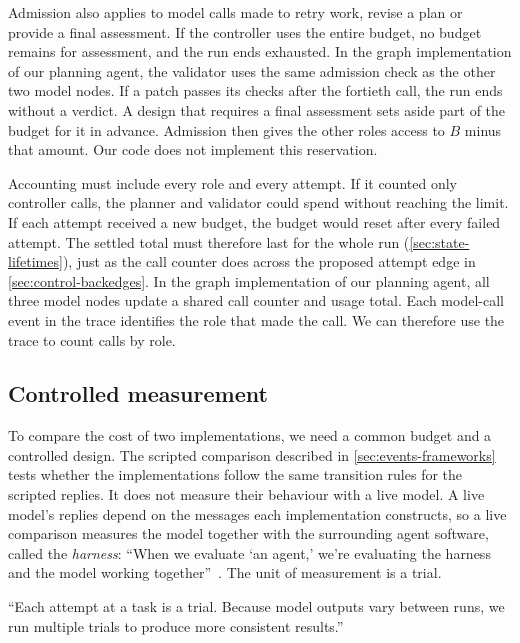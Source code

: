 Admission also applies to model calls made to retry work, revise a plan or provide a final
assessment. If the controller uses the entire budget, no budget remains for assessment, and the
run ends exhausted. In the graph implementation of our planning agent, the validator uses the
same admission check as the other two model nodes. If a patch passes its checks after the
fortieth call, the run ends  without a verdict. A design that requires
a final assessment sets aside part of the budget for it in advance. Admission then gives the
other roles access to $B$ minus that amount. Our code does not implement this reservation.

Accounting must include every role and every attempt. If it counted only controller calls, the
planner and validator could spend without reaching the limit. If each attempt received a new
budget, the budget would reset after every failed attempt. The settled total must therefore last
for the whole run (\cref{sec:state-lifetimes}), just as the call counter does across the proposed
attempt edge in \cref{sec:control-backedges}. In the graph implementation of our planning agent,
all three model nodes update a shared call counter and usage total. Each model-call event in the
trace identifies the role that made the call. We can therefore use the trace to count calls by
role.

\subsection{Controlled measurement}
\label{sec:budgets-measurement}

To compare the cost of two implementations, we need a common budget and a controlled design.
The scripted comparison described in \cref{sec:events-frameworks} tests whether the
implementations follow the same transition rules for the scripted replies. It does not measure
their behaviour with a live model. A live model's replies depend on the messages each
implementation constructs, so a live comparison measures the model together with the
surrounding agent software, called the \emph{harness}:
``When we evaluate `an agent,' we're evaluating the harness and the model working
together''~\citep{anthropic-evals-agents}. The unit of measurement is a trial.

\begin{definition}[Trial]
\label{def:trial}
``Each attempt at a task is a trial. Because model outputs vary between runs, we run multiple trials
to produce more consistent results.''
\end{definition}

